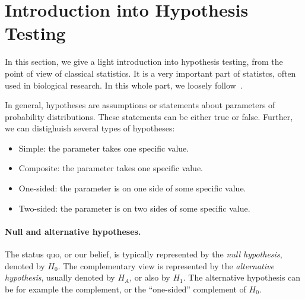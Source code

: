 



\section{Introduction into Hypothesis Testing}
\label{pvalue}
In this section, we give a light introduction into hypothesis testing, from the point of view of classical statistics.
It is a very important part of statistcs, often used in biological research.
In this whole part, we loosely follow~\cite{bertsekas2002introduction}.

In general, hypotheses are assumptions or statements about parameters of probability distributions.
These statements can be either true or false.
Further, we can distighuish several types of hypotheses:
\begin{itemize}
\item
Simple: the parameter takes one specific value. %
\item
Composite: the parameter takes one specific value. %
\item
One-sided: the parameter is on one side of some specific value. %
\item
Two-sided: the parameter is on two sides of some specific value. %
\end{itemize}

\paragraph{Null and alternative hypotheses.}
The status quo, or our belief, is typically represented by the \emph{null hypothesis}, denoted by $H_0$.
The complementary view is represented by the \emph{alternative hypothesis}, usually denoted by $H_A$, or also by $H_1$.
The alternative hypothesis can be for example the complement, or the ``one-sided'' complement of $H_0$.

